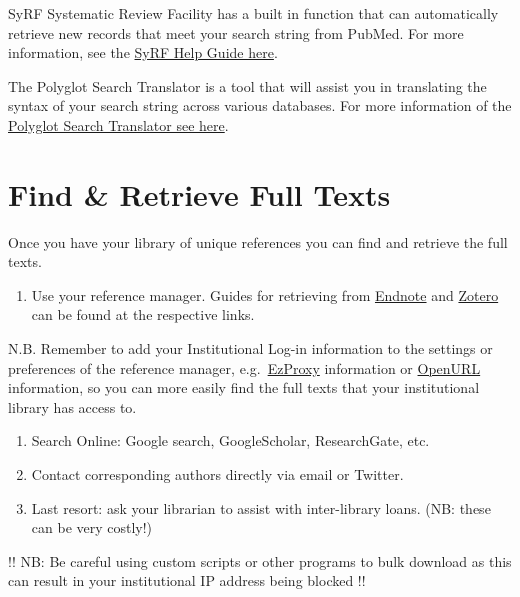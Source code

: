 \documentclass[
]{book}
\providecommand{\tightlist}{%
  \setlength{\itemsep}{0pt}\setlength{\parskip}{0pt}}
\begin{document}
SyRF Systematic Review Facility has a built in function that can automatically retrieve new records that meet your search string from PubMed. For more information, see the \href{https://assets.syrf.org.uk/guides/SyRF_User_Guide.pdf}{SyRF Help Guide here}.

The Polyglot Search Translator is a tool that will assist you in translating the syntax of your search string across various databases. For more information of the \href{https://sr-accelerator.com/\#/polyglot}{Polyglot Search Translator see here}.

\hypertarget{find-retrieve-full-texts}{%
\section{Find \& Retrieve Full Texts}\label{find-retrieve-full-texts}}

Once you have your library of unique references you can find and retrieve the full texts.

\begin{enumerate}
\def\labelenumi{\arabic{enumi}.}
\tightlist
\item
  Use your reference manager. Guides for retrieving from \href{https://subjectguides.library.american.edu/c.php?g=479020\&p=3324236}{Endnote} and \href{https://www.zotero.org/support/locate}{Zotero} can be found at the respective links.
\end{enumerate}

N.B. Remember to add your Institutional Log-in information to the settings or preferences of the reference manager, e.g.~\href{https://ezproxy-db.appspot.com/}{EzProxy} information or \href{https://www.zotero.org/support/locate/openurl_resolvers}{OpenURL} information, so you can more easily find the full texts that your institutional library has access to.

\begin{enumerate}
\def\labelenumi{\arabic{enumi}.}
\setcounter{enumi}{1}
\item
  Search Online: Google search, GoogleScholar, ResearchGate, etc.
\item
  Contact corresponding authors directly via email or Twitter.
\item
  Last resort: ask your librarian to assist with inter-library loans. (NB: these can be very costly!)
\end{enumerate}

!! NB: Be careful using custom scripts or other programs to bulk download as this can result in your institutional IP address being blocked !!
\end{document}
